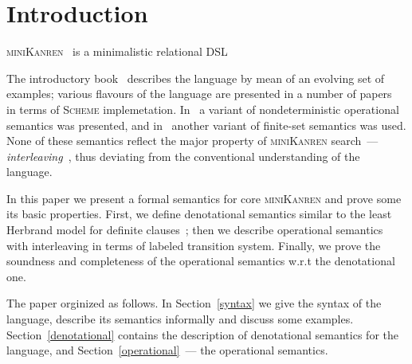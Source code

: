 \section{Introduction}

\textsc{miniKanren}~\cite{TRS} is a minimalistic relational DSL



The introductory book~\cite{TRS} describes the language by mean of an evolving set of examples; various flavours of the language are presented
in a number of papers~\cite{MicroKanren,CKanren,CKanren1,AlphaKanren,2016,Guided} in terms of \textsc{Scheme} implemetation. In~\cite{RelConversion}
a variant of nondeterministic operational semantics was presented, and in~\cite{DivTest} another variant of finite-set semantics was
used. None of these semantics reflect the major property of \textsc{miniKanren} search~--- \emph{interleaving}~\cite{Search}, thus
deviating from the conventional understanding of the language.

In this paper we present a formal semantics for core \textsc{miniKanren} and prove some its basic properties. First,
we define denotational semantics similar to the least Herbrand model for definite clauses~\cite{LHM}; then
we describe operational semantics with interleaving in terms of labeled transition system. Finally, we prove the soundness and
completeness of the operational semantics w.r.t the denotational one. 

The paper orginized as follows. In Section~\ref{syntax} we give the syntax of the language, describe its semantics
informally and discuss some examples. Section~\ref{denotational} contains the description of denotational semantics for
the language, and Section~\ref{operational}~--- the operational semantics.


